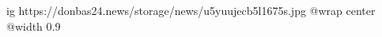  
 
 
 
 

\ifcmt
  ig https://donbas24.news/storage/news/u5yuujecb5l1675s.jpg
  @wrap center
  @width 0.9
\fi
